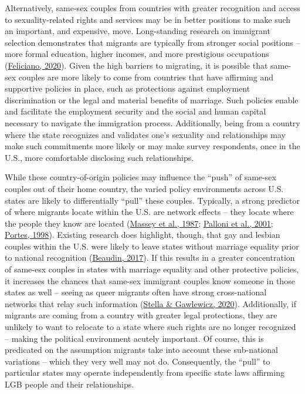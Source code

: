 \documentclass[
  11pt,
]{article}
\begin{document}
Alternatively, same-sex couples from countries with greater recognition and access to sexuality-related rights and services may be in better positions to make such an important, and expensive, move. Long-standing research on immigrant selection demonstrates that migrants are typically from stronger social positions -- more formal education, higher incomes, and more prestigious occupations (\protect\hyperlink{ref-feliciano_2020}{Feliciano, 2020}). Given the high barriers to migrating, it is possible that same-sex couples are more likely to come from countries that have affirming and supportive policies in place, such as protections against employment discrimination or the legal and material benefits of marriage. Such policies enable and facilitate the employment security and the social and human capital necessary to navigate the immigration process. Additionally, being from a country where the state recognizes and validates one's sexuality and relationships may make such commitments more likely or may make survey respondents, once in the U.S., more comfortable disclosing such relationships.

While these country-of-origin policies may influence the ``push'' of same-sex couples out of their home country, the varied policy environments across U.S. states are likely to differentially ``pull'' these couples. Typically, a strong predictor of where migrants locate within the U.S. are network effects -- they locate where the people they know are located (\protect\hyperlink{ref-massey_1987}{Massey et al., 1987}; \protect\hyperlink{ref-palloni_2001}{Palloni et al., 2001}; \protect\hyperlink{ref-portes_1998}{Portes, 1998}). Existing research does highlight, though, that gay and lesbian couples within the U.S. were likely to leave states without marriage equality prior to national recognition (\protect\hyperlink{ref-beaudin_2017}{Beaudin, 2017}). If this results in a greater concentration of same-esx couples in states with marriage equality and other protective policies, it increases the chances that same-sex immigrant couples know someone in those states as well -- seeing as queer migrants often have strong cross-national networks that relay such information (\protect\hyperlink{ref-stella_2020}{Stella \& Gawlewicz, 2020}). Additionally, if migrants are coming from a country with greater legal protections, they are unlikely to want to relocate to a state where such rights are no longer recognized -- making the political environment acutely important. Of course, this is predicated on the assumption migrants take into account these sub-national variations -- which they very well may not do. Consequently, the ``pull'' to particular states may operate independently from specific state laws affirming LGB people and their relationships.
\end{document}

